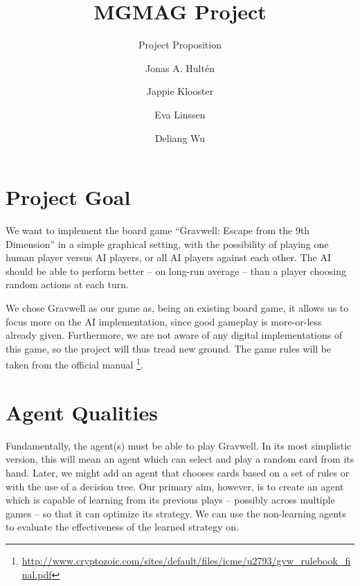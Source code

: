 \documentclass[a4paper]{llncs}
\begin{document}
\title{MGMAG Project}
\subtitle{Project Proposition}
%
%
\author{Jonas A. Hultén \and Jappie Klooster \and Eva Linssen \and Deliang Wu}
%
%

\maketitle              %

\pagestyle{headings}

\section*{Project Goal}

We want to implement the board game ``Gravwell: Escape from the 9th Dimension'' in a simple graphical setting,
with the possibility of playing one human player versus AI players,
or all AI players against each other. The AI should be able to perform
better -- on long-run average -- than a player choosing random actions at
each turn.

We chose Gravwell as our game as, being an existing board game,
it allows us to focus more on the AI implementation,
since good gameplay is more-or-less already given. Furthermore,
we are not aware of any digital implementations of this game, so the
project will thus tread new ground. The game rules will be taken from the
official manual
\footnote{
	\url{http://www.cryptozoic.com/sites/default/files/icme/u2793/gvw_rulebook_final.pdf}
}.

\section*{Agent Qualities}

Fundamentally, the agent(s) must be able to play Gravwell.
In its most simplistic version, this will mean an agent which can select
and play a random card from its hand. Later, we might add an agent that chooses cards based on a set of rules or with the use of a decision tree. Our primary aim, however, is to create an agent which is capable of learning from its previous plays --
possibly across multiple games -- so that it can optimize its strategy. We can use the non-learning agents to evaluate the effectiveness of the learned strategy on.
\end{document}
